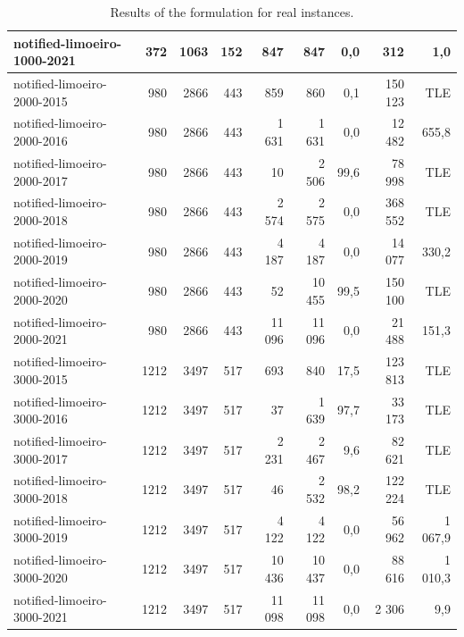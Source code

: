 \documentclass[a4paper,11pt]{article}
\begin{document}
\begin{table}[!ht]
{\begin{tabular}{lrrrrrrrr}
notified-limoeiro-1000-2021   & 372  & 1063 & 152 & 847    & 847    & 0,0  & 312     & 1,0                         \\ \hline
\rowcolor[HTML]{C0C0C0} 
notified-limoeiro-2000-2015   & 980  & 2866 & 443 & 859    & 860    & 0,1  & 150 123 & TLE                         \\
\rowcolor[HTML]{9B9B9B} 
notified-limoeiro-2000-2016   & 980  & 2866 & 443 & 1 631  & 1 631  & 0,0  & 12 482  & 655,8                       \\
\rowcolor[HTML]{C0C0C0} 
notified-limoeiro-2000-2017   & 980  & 2866 & 443 & 10     & 2 506  & 99,6 & 78 998  & \cellcolor[HTML]{C0C0C0}TLE \\
\rowcolor[HTML]{C0C0C0} 
notified-limoeiro-2000-2018   & 980  & 2866 & 443 & 2 574  & 2 575  & 0,0  & 368 552 & TLE                         \\
\rowcolor[HTML]{9B9B9B} 
notified-limoeiro-2000-2019   & 980  & 2866 & 443 & 4 187  & 4 187  & 0,0  & 14 077  & 330,2                       \\
\rowcolor[HTML]{C0C0C0} 
notified-limoeiro-2000-2020   & 980  & 2866 & 443 & 52     & 10 455 & 99,5 & 150 100 & \cellcolor[HTML]{C0C0C0}TLE \\
\rowcolor[HTML]{9B9B9B} 
{ notified-limoeiro-2000-2021} &
  {980} &
  {2866} &
  {443} &
  {11 096} &
  {11 096} &
  {0,0} &
  {21 488} &
  {151,3} \\ \hline
\rowcolor[HTML]{C0C0C0} 
notified-limoeiro-3000-2015   & 1212 & 3497 & 517 & 693    & 840    & 17,5 & 123 813 & \cellcolor[HTML]{C0C0C0}TLE \\
\rowcolor[HTML]{C0C0C0} 
notified-limoeiro-3000-2016   & 1212 & 3497 & 517 & 37     & 1 639  & 97,7 & 33 173  & \cellcolor[HTML]{C0C0C0}TLE \\
\rowcolor[HTML]{C0C0C0} 
notified-limoeiro-3000-2017   & 1212 & 3497 & 517 & 2 231  & 2 467  & 9,6  & 82 621  & \cellcolor[HTML]{C0C0C0}TLE \\
\rowcolor[HTML]{C0C0C0} 
notified-limoeiro-3000-2018   & 1212 & 3497 & 517 & 46     & 2 532  & 98,2 & 122 224 & \cellcolor[HTML]{C0C0C0}TLE \\
\rowcolor[HTML]{9B9B9B} 
notified-limoeiro-3000-2019   & 1212 & 3497 & 517 & 4 122  & 4 122  & 0,0  & 56 962  & 1 067,9                     \\
\rowcolor[HTML]{9B9B9B} 
notified-limoeiro-3000-2020   & 1212 & 3497 & 517 & 10 436 & 10 437 & 0,0  & 88 616  & 1 010,3                     \\
\rowcolor[HTML]{9B9B9B} 
notified-limoeiro-3000-2021   & 1212 & 3497 & 517 & 11 098 & 11 098 & 0,0  & 2 306   & 9,9                         \\ \hline
\end{tabular}%
}
\caption{Results of the formulation for real instances.}
\label{tab:model-results}
\end{table}
\end{document}
